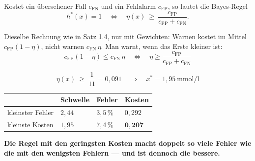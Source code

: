 \begin{merksatz}
Kostet ein übersehener Fall $c_{\text{FN}}$ und ein Fehlalarm $c_{\text{FP}}$, so lautet die Bayes-Regel
\[ h^{*}(x) = 1 \quad\Longleftrightarrow\quad \eta(x) \ \ge\ \frac{c_{\text{FP}}}{c_{\text{FP}}+c_{\text{FN}}} . \]

Dieselbe Rechnung wie in Satz 1.4, nur mit Gewichten: Warnen kostet im Mittel $c_{\text{FP}}(1-\eta)$, nicht warnen $c_{\text{FN}}\,\eta$. Man warnt, wenn das Erste kleiner ist:
\[ c_{\text{FP}}(1-\eta) \le c_{\text{FN}}\,\eta \quad\Longleftrightarrow\quad \eta \ge \frac{c_{\text{FP}}}{c_{\text{FP}}+c_{\text{FN}}} \]

\[ \eta(x) \ \ge\ \frac{1}{11} = 0{,}091 \quad\Longrightarrow\quad x^{*} = 1{,}95 \ \text{mmol/l} \]

\begin{center}
{\small
\renewcommand{\arraystretch}{1.5}
\begin{tabular}{@{}P{2.6cm}P{1.8cm}P{1.8cm}P{2.0cm}@{}}
\toprule
& \textbf{Schwelle} & \textbf{Fehler} & \textbf{Kosten}\\
\midrule
kleinster Fehler & $2{,}44$ & $3{,}5\,\%$ & $0{,}292$\\
kleinste Kosten & $1{,}95$ & $7{,}4\,\%$ & $\mathbf{0{,}207}$\\
\bottomrule
\end{tabular}}
\end{center}

\begin{center}
\begin{minipage}{0.9\textwidth}
\textbf{Die Regel mit den geringsten Kosten macht doppelt so viele Fehler wie die mit den wenigsten Fehlern --- und ist dennoch die bessere.}
\end{minipage}
\end{center}

\begin{center}
\begin{minipage}{0.88\textwidth}
\end{minipage}
\end{center}
\end{merksatz}


